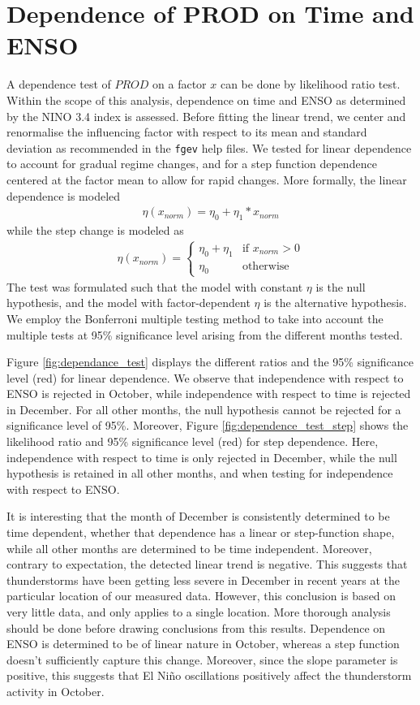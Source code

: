\documentclass[10pt,conference,compsocconf]{IEEEtran}
\begin{document}
\section*{Dependence of PROD on Time and ENSO}
A dependence test of $PROD$ on a factor $x$ can be done by likelihood ratio test. Within the scope of this analysis, dependence on time and ENSO as determined by the NINO 3.4 index is assessed. Before fitting the linear trend, we center and renormalise the influencing factor with respect to its mean and standard deviation as recommended in the \texttt{fgev} help files. We tested for linear dependence to account for gradual regime changes, and for a step function dependence centered at the factor mean to allow for rapid changes. More formally, the linear dependence is modeled
\begin{align*}
	\eta(x_{norm}) = \eta_0 + \eta_1*x_{norm}
\end{align*}
while the step change is modeled as 
\begin{align*}
	\eta(x_{norm}) = \begin{cases} \eta_0+\eta_1 & \textrm{if } x_{norm}>0\\ \eta_0 & \textrm{otherwise} \end{cases}
\end{align*}
The test was formulated such that the model with constant $\eta$ is the null hypothesis, and the model with factor-dependent $\eta$ is the alternative hypothesis. We employ the Bonferroni multiple testing method to take into account the multiple tests at 95\% significance level arising from the different months tested. 
\par
Figure \ref{fig:dependance_test} displays the different ratios and the 95\% significance level (red) for linear dependence. We observe that independence with respect to ENSO is rejected in October, while independence with respect to time is rejected in December. For all other months, the null hypothesis cannot be rejected for a significance level of 95\%. Moreover, Figure \ref{fig:dependence_test_step} shows the likelihood ratio and 95\% significance level (red) for step dependence. Here, independence with respect to time is only rejected in December, while the null hypothesis is retained in all other months, and when testing for independence with respect to ENSO. 
\par
It is interesting that the month of December is consistently determined to be time dependent, whether that dependence has a linear or step-function shape, while all other months are determined to be time independent. Moreover, contrary to expectation, the detected linear trend is negative. This suggests that thunderstorms have been getting less severe in December in recent years at the particular location of our measured data. However, this conclusion is based on very little data, and only applies to a single location. More thorough analysis should be done before drawing conclusions from this results. Dependence on ENSO is determined to be of linear nature in October, whereas a step function doesn't sufficiently capture this change. Moreover, since the slope parameter is positive, this suggests that El Niño oscillations positively affect the thunderstorm activity in October. 
\end{document}
